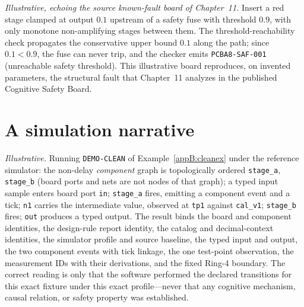 \begin{example}\label{appB:saf001}
\textit{Illustrative, echoing the source known-fault board of Chapter~11.} Insert
a red stage clamped at output $0.1$ upstream of a safety fuse with threshold
$0.9$, with only monotone non-amplifying stages between them. The
threshold-reachability check propagates the conservative upper bound $0.1$ along
the path; since $0.1<0.9$, the fuse can never trip, and the checker emits
\texttt{PCBA8-SAF-001} (unreachable safety threshold). This illustrative board
reproduces, on invented parameters, the structural fault that Chapter~11 analyzes
in the published Cognitive Safety Board.
\end{example}

\section{A simulation narrative}\label{appB:sim}

\begin{example}\label{appB:trace}
\textit{Illustrative.} Running \texttt{DEMO-CLEAN} of Example~\ref{appB:cleanex}
under the reference simulator: the non-delay \emph{component} graph is
topologically ordered \texttt{stage\_a}, \texttt{stage\_b} (board ports and nets
are not nodes of that graph); a typed input sample enters board port \texttt{in}; \texttt{stage\_a} fires, emitting a
component event and a tick; \texttt{n1} carries the intermediate value, observed
at \texttt{tp1} against \texttt{cal\_v1}; \texttt{stage\_b} fires; \texttt{out}
produces a typed output. The result binds the board and component identities, the
design-rule report identity, the catalog and decimal-context identities, the
simulator profile and source baseline, the typed input and output, the two
component events with tick linkage, the one test-point observation, the
measurement IDs with their derivations, and the fixed Ring-4 boundary. The
correct reading is only that the software performed the declared transitions for
this exact fixture under this exact profile---never that any cognitive mechanism,
causal relation, or safety property was established.
\end{example}
